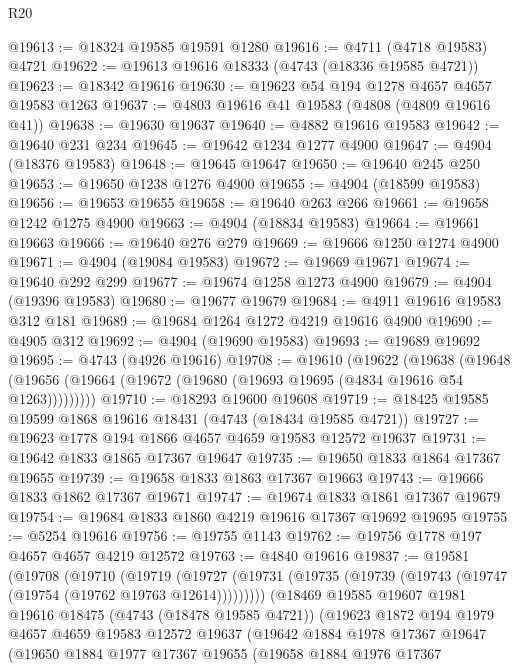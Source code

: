 \begin{lexlean}{R20}
\begin{coremodule}
@19613 := @18324 @19585 @19591 @1280
@19616 := @4711 (@4718 @19583) @4721
@19622 := @19613 @19616 @18333 (@4743 (@18336 @19585 @4721))
@19623 := @18342 @19616
@19630 := @19623 @54 @194 @1278 @4657 @4657 @19583 @1263
@19637 := @4803 @19616 @41 @19583 (@4808 (@4809 @19616 @41))
@19638 := @19630 @19637
@19640 := @4882 @19616 @19583
@19642 := @19640 @231 @234
@19645 := @19642 @1234 @1277 @4900
@19647 := @4904 (@18376 @19583)
@19648 := @19645 @19647
@19650 := @19640 @245 @250
@19653 := @19650 @1238 @1276 @4900
@19655 := @4904 (@18599 @19583)
@19656 := @19653 @19655
@19658 := @19640 @263 @266
@19661 := @19658 @1242 @1275 @4900
@19663 := @4904 (@18834 @19583)
@19664 := @19661 @19663
@19666 := @19640 @276 @279
@19669 := @19666 @1250 @1274 @4900
@19671 := @4904 (@19084 @19583)
@19672 := @19669 @19671
@19674 := @19640 @292 @299
@19677 := @19674 @1258 @1273 @4900
@19679 := @4904 (@19396 @19583)
@19680 := @19677 @19679
@19684 := @4911 @19616 @19583 @312 @181
@19689 := @19684 @1264 @1272 @4219 @19616 @4900
@19690 := @4905 @312
@19692 := @4904 (@19690 @19583)
@19693 := @19689 @19692
@19695 := @4743 (@4926 @19616)
@19708 := @19610
    (@19622
      (@19638
        (@19648 (@19656 (@19664 (@19672 (@19680 (@19693 @19695 (@4834 @19616 @54 @1263)))))))))
@19710 := @18293 @19600 @19608
@19719 := @18425 @19585 @19599 @1868 @19616 @18431 (@4743 (@18434 @19585 @4721))
@19727 := @19623 @1778 @194 @1866 @4657 @4659 @19583 @12572 @19637
@19731 := @19642 @1833 @1865 @17367 @19647
@19735 := @19650 @1833 @1864 @17367 @19655
@19739 := @19658 @1833 @1863 @17367 @19663
@19743 := @19666 @1833 @1862 @17367 @19671
@19747 := @19674 @1833 @1861 @17367 @19679
@19754 := @19684 @1833 @1860 @4219 @19616 @17367 @19692 @19695
@19755 := @5254 @19616
@19756 := @19755 @1143
@19762 := @19756 @1778 @197 @4657 @4657 @4219 @12572
@19763 := @4840 @19616
@19837 := @19581
    (@19708
      (@19710
        (@19719
          (@19727 (@19731 (@19735 (@19739 (@19743 (@19747 (@19754 (@19762 @19763 @12614)))))))))
        (@18469
          @19585
          @19607
          @1981
          @19616
          @18475
          (@4743 (@18478 @19585 @4721))
          (@19623
            @1872
            @194
            @1979
            @4657
            @4659
            @19583
            @12572
            @19637
            (@19642
              @1884
              @1978
              @17367
              @19647
              (@19650
                @1884
                @1977
                @17367
                @19655
                (@19658
                  @1884
                  @1976
                  @17367

\end{coremodule}
\end{lexlean}
